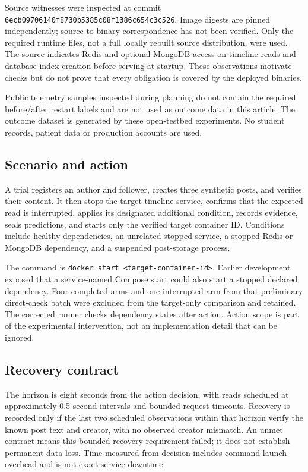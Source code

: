 \documentclass[11pt]{article}
\begin{document}
Source witnesses were inspected at commit \texttt{6ecb09706140f8730b5385c08f1386c654c3c526}. Image digests are pinned independently; source-to-binary correspondence has not been verified. Only the required runtime files, not a full locally rebuilt source distribution, were used. The source indicates Redis and optional MongoDB access on timeline reads and database-index creation before serving at startup. These observations motivate checks but do not prove that every obligation is covered by the deployed binaries.

Public telemetry samples inspected during planning do not contain the required before/after restart labels and are not used as outcome data in this article. The outcome dataset is generated by these open-testbed experiments. No student records, patient data or production accounts are used.

\subsection{Scenario and action}
A trial registers an author and follower, creates three synthetic posts, and verifies their content. It then stops the target timeline service, confirms that the expected read is interrupted, applies its designated additional condition, records evidence, seals predictions, and starts only the verified target container ID. Conditions include healthy dependencies, an unrelated stopped service, a stopped Redis or MongoDB dependency, and a suspended post-storage process.

The command is \texttt{docker start <target-container-id>}. Earlier development exposed that a service-named Compose start could also start a stopped declared dependency. Four completed arms and one interrupted arm from that preliminary direct-check batch were excluded from the target-only comparison and retained. The corrected runner checks dependency states after action. Action scope is part of the experimental intervention, not an implementation detail that can be ignored.

\subsection{Recovery contract}
The horizon is eight seconds from the action decision, with reads scheduled at approximately 0.5-second intervals and bounded request timeouts. Recovery is recorded only if the last two scheduled observations within that horizon verify the known post text and creator, with no observed creator mismatch. An unmet contract means this bounded recovery requirement failed; it does not establish permanent data loss. Time measured from decision includes command-launch overhead and is not exact service downtime.
\end{document}
